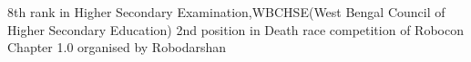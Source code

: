 %
%


\begin{scholarship}
					{8th rank in Higher Secondary Examination,WBCHSE(West Bengal Council of Higher Secondary Education)}
                    {2nd position in Death race competition of Robocon Chapter 1.0 organised by Robodarshan}
\end{scholarship}